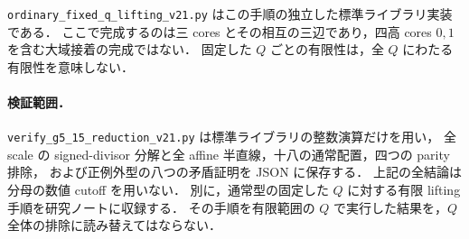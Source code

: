 \nolinkurl{ordinary_fixed_q_lifting_v21.py} はこの手順の独立した標準ライブラリ実装である．
ここで完成するのは三 cores とその相互の三辺であり，四高 cores $0,1$ を含む大域接着の完成ではない．
固定した $Q$ ごとの有限性は，全 $Q$ にわたる有限性を意味しない．

\paragraph{検証範囲．}
\nolinkurl{verify_g5_15_reduction_v21.py} は標準ライブラリの整数演算だけを用い，
全 scale の signed-divisor 分解と全 affine 半直線，十八の通常配置，四つの parity 排除，
および正例外型の八つの矛盾証明を JSON に保存する．
上記の全結論は分母の数値 cutoff を用いない．
別に，通常型の固定した $Q$ に対する有限 lifting 手順を研究ノートに収録する．
その手順を有限範囲の $Q$ で実行した結果を，$Q$ 全体の排除に読み替えてはならない．
